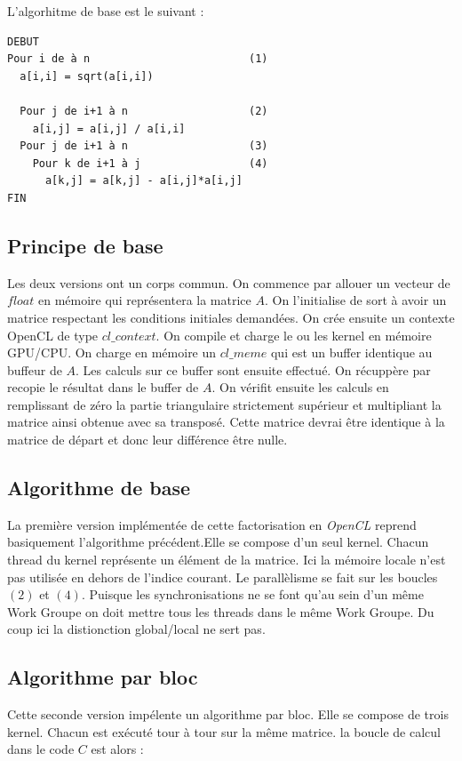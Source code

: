 \documentclass[paper=a4, fontsize=11pt]{scrartcl} %
\numberwithin{equation}{section} %
\numberwithin{figure}{section} %
\numberwithin{table}{section} %
\begin{document}
L'algorhitme de base est le suivant :
\begin{verbatim}
DEBUT
Pour i de à n                         (1)
  a[i,i] = sqrt(a[i,i])
  
  Pour j de i+1 à n                   (2)
    a[i,j] = a[i,j] / a[i,i]
  Pour j de i+1 à n                   (3)
    Pour k de i+1 à j                 (4)
      a[k,j] = a[k,j] - a[i,j]*a[i,j] 
FIN
\end{verbatim}

\subsection{Principe de base}
Les deux versions ont un corps commun.  On commence par allouer un
vecteur de $float$ en mémoire qui représentera la matrice $A$. On
l'initialise de sort à avoir un matrice respectant les conditions
initiales demandées. On crée ensuite un contexte OpenCL de type
$cl\_context$. On compile et charge le ou les kernel en mémoire
GPU/CPU. On charge en mémoire un $cl\_meme$ qui est un buffer
identique au buffeur de $A$. Les calculs sur ce buffer sont ensuite
effectué. On récuppère par recopie le résultat dans le buffer de $A$.
On vérifit ensuite les calculs en remplissant de zéro la partie
triangulaire strictement supérieur et multipliant la matrice ainsi
obtenue avec sa transposé. Cette matrice devrai être identique à la
matrice de départ et donc leur différence être nulle.


\subsection{Algorithme de base}
La première version implémentée de cette factorisation en
\textit{OpenCL} reprend basiquement l'algorithme précédent.Elle se
compose d'un seul kernel. Chacun thread du kernel représente un
élément de la matrice. Ici la mémoire locale n'est pas utilisée en
dehors de l'indice courant.  Le parallèlisme se fait sur les boucles
$(2)$ et $(4)$.  Puisque les synchronisations ne se font qu'au sein
d'un même Work Groupe on doit mettre tous les threads dans le même
Work Groupe. Du coup ici la distionction global/local ne sert pas.


\subsection{Algorithme par bloc}
Cette seconde version impélente un algorithme par bloc. Elle se
compose de trois kernel. Chacun est exécuté tour à tour sur la
même matrice. la boucle de calcul dans le code $C$ est alors :
\end{document}
